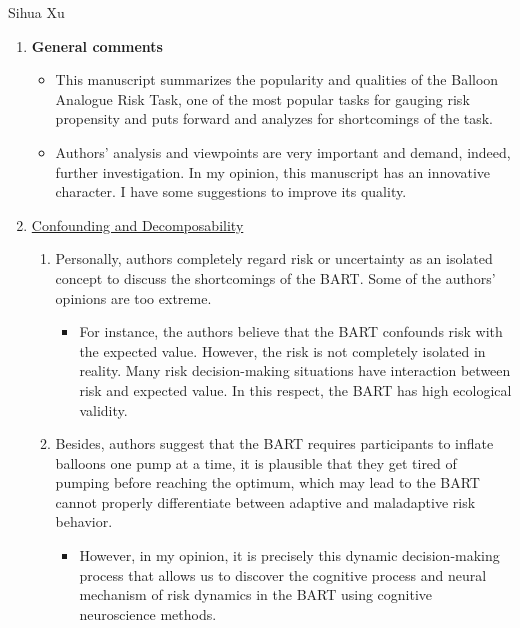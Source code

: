 \documentclass[serif, twocolumn, review]{jote-article}
\begin{document}
\begin{paracol}{2}
\begin{reviewend}{Sihua Xu}
    \begin{enumerate}[label=\textbf{\arabic*}), start=0]
    \item \textbf{General comments}
        \begin{itemize}
            \item This manuscript summarizes the popularity and qualities of the Balloon Analogue Risk Task, one of the most popular tasks for gauging risk propensity and puts forward and analyzes for shortcomings of the task.
            \item Authors' analysis and viewpoints are very important and demand, indeed, further investigation. In my opinion, this manuscript has an innovative character. I have some suggestions to improve its quality. 
        \end{itemize}

    \item \hyperref[sec:confounding]{Confounding and Decomposability}
        \begin{enumerate}
            \item Personally, authors completely regard risk or uncertainty as an isolated concept to discuss the shortcomings of the BART. Some of the authors’ opinions are too extreme.  
            \begin{itemize}
                \item For instance, the authors believe that the BART confounds risk with the expected value. However, the risk is not completely isolated in reality. Many risk decision-making situations have interaction between risk and expected value. In this respect, the BART has high ecological validity. 
            \end{itemize}
            \item Besides, authors suggest that the BART requires participants to inflate balloons one pump at a time, it is plausible that they get tired of pumping before reaching the optimum, which may lead to the BART cannot properly differentiate between adaptive and maladaptive risk behavior.   
            \begin{itemize}
                \item However, in my opinion, it is precisely this dynamic decision-making process that allows us to discover the cognitive process and neural mechanism of risk dynamics in the BART using cognitive neuroscience methods.   
            \end{itemize}            
        \end{enumerate}


\end{enumerate}
\end{reviewend}
\end{paracol}
\end{document}
